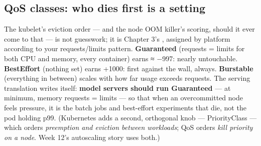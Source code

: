 \subsection*{QoS classes: who dies first is a setting}

The kubelet's eviction order — and the node OOM killer's scoring, should it ever come to that — is not guesswork; it is Chapter 3's , assigned by platform according to your requests/limits pattern. \textbf{Guaranteed} (requests = limits for both CPU and memory, every container) earns ≈ −997: nearly untouchable. \textbf{BestEffort} (nothing set) earns +1000: first against the wall, always. \textbf{Burstable} (everything in between) scales with how far usage exceeds requests. The serving translation writes itself: \textbf{model servers should run Guaranteed} — at minimum, memory requests = limits — so that when an overcommitted node feels pressure, it is the batch jobs and best-effort experiments that die, not the pod holding p99. (Kubernetes adds a second, orthogonal knob — PriorityClass — which orders \textit{preemption and eviction between workloads}; QoS orders \textit{kill priority on a node}. Week 12's autoscaling story uses both.)

